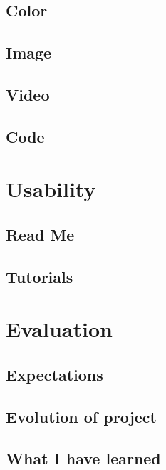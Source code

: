 \documentclass[a4paper]{report}
\begin{document}
\section{Color}
\section{Image}
\section{Video}
\section{Code}

\chapter{Usability}
\section{Read Me}
\section{Tutorials}

\chapter{Evaluation}
\section{Expectations}
\section{Evolution of project}
\section{What I have learned}




\end{document}
